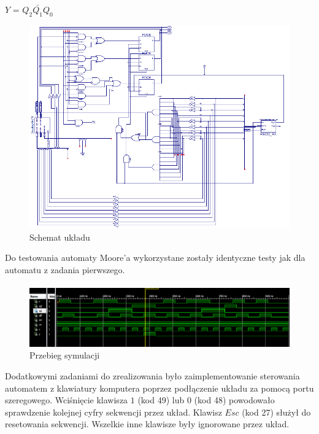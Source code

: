\documentclass[wide,a4paper,titlepage,12pt] {article}
\begin{document}
  \begin{center}
    $Y$ = $Q_{2} \bar{Q_{1}} Q_{0} $
  \end{center}


  \begin{figure}[htbp]
    \begin{center}
      \includegraphics[scale=0.6]{moore-sch.png}
      \caption{Schemat układu}
     \end{center}
  \end{figure}

Do testowania automaty Moore'a wykorzystane zostały identyczne testy jak dla automatu z zadania pierwszego.

\paragraph{}

  \begin{figure}[htbp]
    \begin{center}
      \includegraphics[scale=0.5]{moore-sim.png}
      \caption{Przebieg symulacji}
     \end{center}
  \end{figure}

Dodatkowymi zadaniami do zrealizowania było zaimplementowanie sterowania automatem z klawiatury komputera poprzez podłączenie układu za pomocą portu szeregowego. Wciśnięcie klawisza $1$ (kod 49) lub $0$ (kod 48) powodowało sprawdzenie kolejnej cyfry sekwencji przez układ. Klawisz $Esc$ (kod 27) służył do resetowania sekwencji. Wszelkie inne klawisze były ignorowane przez układ.
\end{document}

